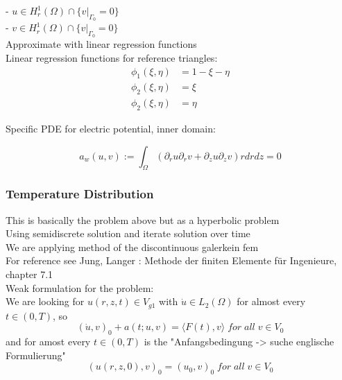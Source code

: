 \documentclass[parskip=half, titlepage=yes, 12pt, BCOR=12mm, DIV=calc]{scrartcl}
\begin{document}
- $u \in H_r^1(\Omega) \cap \{v|_{\Gamma_{0}} = 0 \} $ \\
- $v \in H_r^1(\Omega) \cap \{v|_{\Gamma_{0}} = 0 \} $ \\

Approximate with linear regression functions\\
Linear regression functions for reference triangles:
\begin{align}
    \phi_1(\xi, \eta) &= 1 - \xi - \eta \\
    \phi_2(\xi, \eta) &= \xi \\
    \phi_2(\xi, \eta) &= \eta 
\end{align}

Specific PDE for electric potential, inner domain: 

\begin{equation}
    a_w(u,v) := \int_{\Omega} (\partial_r u \partial_r v + \partial_z u \partial_z v) r drdz = 0 
\end{equation}

\subsubsection{Temperature Distribution}

This is basically the problem above but as a hyperbolic problem \\
Using semidiscrete solution and iterate solution over time \\
We are applying method of the discontinuous galerkein fem \\
For reference see Jung, Langer : Methode der finiten Elemente für Ingenieure, chapter 7.1 \\



Weak formulation for the problem: \\

We are looking for $u(r,z,t) \in V_{g1}$ with $\Dot{u} \in L_2(\Omega)$ for almost every $t \in (0,T)$, so \\ \begin{equation}
(\Dot{u},v)_0 + a(t;u,v) = \langle F(t),v \rangle \; for \; all \; v \in V_0    
\end{equation}
and for amost every $t \in (0, T)$ is the "Anfangsbedingung -> suche englische Formulierung"
\begin{equation}
    (u(r,z,0),v)_0 = (u_0,v)_0 \; for \; all \; v \in V_0
\end{equation}
\end{document}

